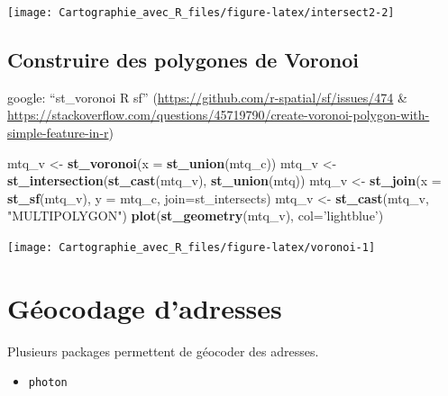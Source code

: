 \documentclass[]{book}
\newenvironment{Shaded}{\begin{snugshade}}{\end{snugshade}}
\newcommand{\KeywordTok}[1]{\textcolor[rgb]{0.13,0.29,0.53}{\textbf{#1}}}
\newcommand{\DataTypeTok}[1]{\textcolor[rgb]{0.13,0.29,0.53}{#1}}
\newcommand{\StringTok}[1]{\textcolor[rgb]{0.31,0.60,0.02}{#1}}
\newcommand{\NormalTok}[1]{#1}
\providecommand{\tightlist}{%
  \setlength{\itemsep}{0pt}\setlength{\parskip}{0pt}}
\begin{document}
\begin{center}\texttt{[image: Cartographie\_avec\_R\_files/figure-latex/intersect2-2]} \end{center}

\subsection{Construire des polygones de
Voronoi}\label{construire-des-polygones-de-voronoi}

google: ``st\_voronoi R sf''
(\url{https://github.com/r-spatial/sf/issues/474} \&
\url{https://stackoverflow.com/questions/45719790/create-voronoi-polygon-with-simple-feature-in-r})

\begin{Shaded}
\begin{Highlighting}[]
\NormalTok{mtq_v <-}\StringTok{ }\KeywordTok{st_voronoi}\NormalTok{(}\DataTypeTok{x =} \KeywordTok{st_union}\NormalTok{(mtq_c))}
\NormalTok{mtq_v <-}\StringTok{ }\KeywordTok{st_intersection}\NormalTok{(}\KeywordTok{st_cast}\NormalTok{(mtq_v), }\KeywordTok{st_union}\NormalTok{(mtq))}
\NormalTok{mtq_v <-}\StringTok{ }\KeywordTok{st_join}\NormalTok{(}\DataTypeTok{x =} \KeywordTok{st_sf}\NormalTok{(mtq_v), }\DataTypeTok{y =}\NormalTok{ mtq_c, }\DataTypeTok{join=}\NormalTok{st_intersects)}
\NormalTok{mtq_v <-}\StringTok{ }\KeywordTok{st_cast}\NormalTok{(mtq_v, }\StringTok{"MULTIPOLYGON"}\NormalTok{)}
\KeywordTok{plot}\NormalTok{(}\KeywordTok{st_geometry}\NormalTok{(mtq_v), }\DataTypeTok{col=}\StringTok{'lightblue'}\NormalTok{)}
\end{Highlighting}
\end{Shaded}

\begin{center}\texttt{[image: Cartographie\_avec\_R\_files/figure-latex/voronoi-1]} \end{center}

\section{Géocodage d'adresses}\label{geocodage-dadresses}

Plusieurs packages permettent de géocoder des adresses.

\begin{itemize}
\tightlist
\item
  \texttt{photon} \citep{R-photon}
\end{itemize}
\end{document}
